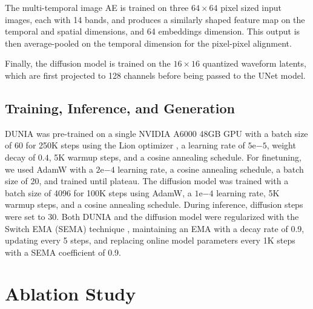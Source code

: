 The multi-temporal image AE is trained on three $64 \times 64$ pixel sized input images, each with 14 bands, and produces a similarly shaped feature map on the temporal and spatial dimensions, and 64 embeddings dimension. This output is then average-pooled on the temporal dimension for the pixel-pixel alignment.

Finally, the diffusion model is trained on the $16 \times 16$ quantized waveform latents, which are first projected to 128 channels before being passed to the UNet model. 

\subsection{Training, Inference, and Generation}
DUNIA was pre-trained on a single NVIDIA A6000 48GB GPU with a batch size of 60 for 250K steps using the Lion optimizer \cite{chen2024LION}, a learning rate of $5\mathrm{e}{-5}$, weight decay of $0.4$, 5K warmup steps, and a cosine annealing schedule. For finetuning, we used AdamW \cite{loshchilov2017adamw} with a $2\mathrm{e}{-4}$ learning rate, a cosine annealing schedule, a batch size of 20, and trained until plateau. The diffusion model was trained with a batch size of 4096 for 100K steps using AdamW, a $1\mathrm{e}{-4}$ learning rate, 5K warmup steps, and a cosine annealing schedule. During inference, diffusion steps were set to 30. Both DUNIA and the diffusion model were regularized with the Switch EMA (SEMA) technique \cite{li2024sema}, maintaining an EMA with a decay rate of 0.9, updating every 5 steps, and replacing online model parameters every 1K steps with a SEMA coefficient of 0.9.

\section{Ablation Study}\label{appendix:ablations}
